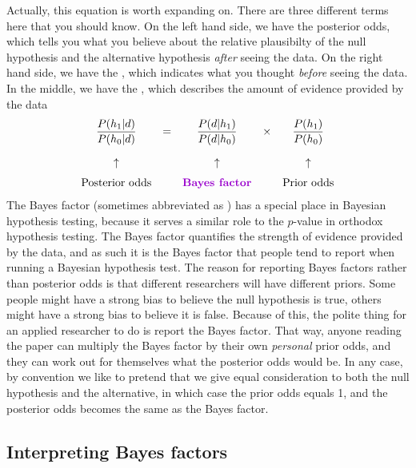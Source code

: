 Actually, this equation is worth expanding on. There are three different terms here that you should know. On the left hand side, we have the posterior odds, which tells you what you believe about the relative plausibilty of the null hypothesis and the alternative hypothesis {\it after} seeing the data. On the right hand side, we have the , which indicates what you thought {\it before} seeing the data. In the middle, we have the , which describes the amount of evidence provided by the data
$$
\begin{array}{ccccc}\displaystyle
\frac{P(h_1 | d)}{P(h_0 | d)} &=& \displaystyle\frac{P(d|h_1)}{P(d|h_0)} &\times& \displaystyle\frac{P(h_1)}{P(h_0)} \\[6pt] \\[-2pt]
\uparrow && \uparrow && \uparrow \\[6pt]
\mbox{Posterior odds} && \mbox{\keyterm{Bayes factor}} && \mbox{Prior odds}
\end{array}
$$
The Bayes factor (sometimes abbreviated as ) has a special place in Bayesian hypothesis testing, because it serves a similar role to the $p$-value in orthodox hypothesis testing. The Bayes factor quantifies the strength of evidence provided by the data, and as such it is the Bayes factor that people tend to report when running a Bayesian hypothesis test. The reason for reporting Bayes factors rather than posterior odds is that different researchers will have different priors. Some people might have a strong bias to believe the null hypothesis is true, others might have a strong bias to believe it is false. Because of this, the polite thing for an applied researcher to do is report the Bayes factor. That way, anyone reading the paper can multiply the Bayes factor by their own {\it personal} prior odds, and they can work out for themselves what the posterior odds would be. In any case, by convention we like to pretend that we give equal consideration to both the null hypothesis and the alternative, in which case the prior odds equals 1, and the posterior odds becomes the same as the Bayes factor.

\subsection{Interpreting Bayes factors}

